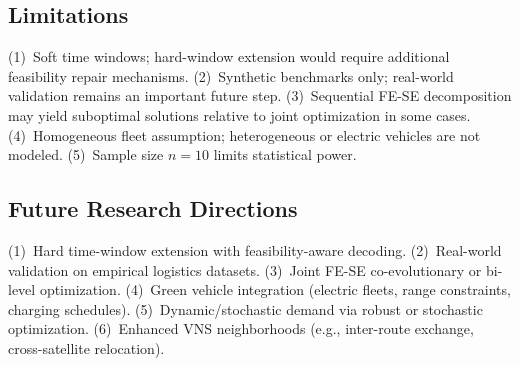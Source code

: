 \documentclass[11pt, a4paper]{article}
\numberwithin{equation}{section}
\begin{document}
\subsection{Limitations}

(1)~Soft time windows; hard-window extension would require additional
feasibility repair mechanisms.  (2)~Synthetic benchmarks only; real-world
validation remains an important future step.  (3)~Sequential FE-SE
decomposition may yield suboptimal solutions relative to joint optimization
in some cases.  (4)~Homogeneous fleet assumption; heterogeneous or electric
vehicles are not modeled.  (5)~Sample size $n=10$ limits statistical power.

\subsection{Future Research Directions}

(1)~Hard time-window extension with feasibility-aware decoding.
(2)~Real-world validation on empirical logistics datasets.
(3)~Joint FE-SE co-evolutionary or bi-level optimization.
(4)~Green vehicle integration (electric fleets, range constraints, charging
schedules).
(5)~Dynamic/stochastic demand via robust or stochastic optimization.
(6)~Enhanced VNS neighborhoods (e.g., inter-route exchange, cross-satellite
relocation).

\printbibliography
\end{document}
